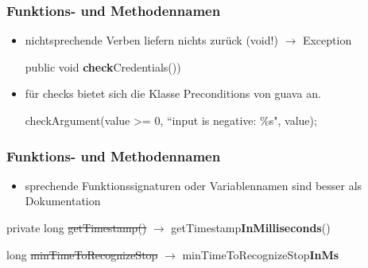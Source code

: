 \begin{frame}
  \frametitle{Funktions- und Methodennamen}
  \begin{itemize}
  \item nichtsprechende Verben liefern nichts zurück (void!) $\rightarrow$ Exception
  \begin{Beispiel}
  \par public void \textbf{check}Credentials())
  \end{Beispiel} 
  
  \item für checks bietet sich die Klasse Preconditions von guava an.
  \begin{Beispiel}
  \par checkArgument(value >= 0, ``input is negative: \%s", value);
  \end{Beispiel}
  \end{itemize}

\end{frame}

\begin{frame}
\frametitle{Funktions- und Methodennamen}
  \begin{itemize}
    \item sprechende Funktionssignaturen oder Variablennamen sind besser als Dokumentation
    \end{itemize}
  \begin{Beispiel}
  \par private long \sout{getTimestamp()} $\rightarrow$ getTimestamp\textbf{InMilliseconds}()
  \par long \sout{minTimeToRecognizeStop} $\rightarrow$ minTimeToRecognizeStop\textbf{InMs}
  \end{Beispiel}

\end{frame}

